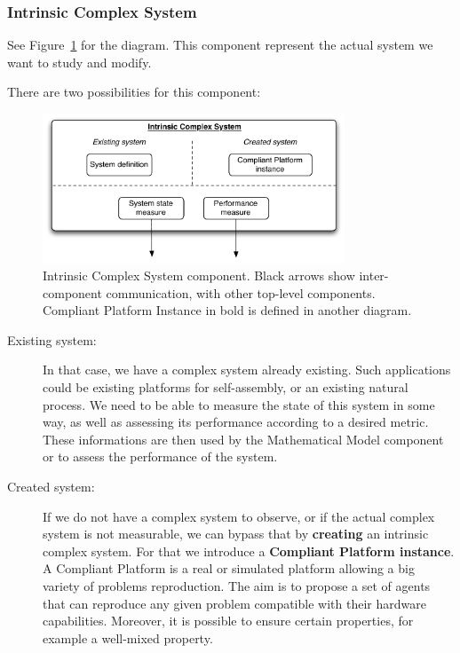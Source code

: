\subsubsection{Intrinsic Complex System} %
\label{ssub:intrinsic_complex_system}

See Figure~\ref{fig:img_intrinsic_complex_system} for the diagram. This component represent the actual system we want to study and modify.

There are two possibilities for this component:


\begin{figure}[h!]
	\centering
		\includegraphics[width=9cm]{img/intrinsic_complex_system.pdf}
	\caption{Intrinsic Complex System component. Black arrows show inter-component communication, with other top-level components. Compliant Platform Instance in bold is defined in another diagram.}
	\label{fig:img_intrinsic_complex_system}
\end{figure}

\begin{description}
	\item[Existing system:] In that case, we have a complex system already existing. Such applications could be existing platforms for self-assembly, or an existing natural process. We need to be able to measure the state of this system in some way, as well as assessing its performance according to a desired metric. These informations are then used by the Mathematical Model component or to assess the performance of the system.
	\item[Created system:] If we do not have a complex system to observe, or if the actual complex system is not measurable, we can bypass that by \textbf{creating} an intrinsic complex system. For that we introduce a \textbf{Compliant Platform instance}. A Compliant Platform is a real or simulated platform allowing a big variety of problems reproduction. The aim is to propose a set of agents that can reproduce any given problem compatible with their hardware capabilities. Moreover, it is possible to ensure certain properties, for example a well-mixed property.
\end{description}

